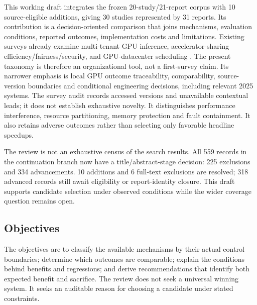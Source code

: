 This working draft integrates the frozen 20-study/21-report corpus with 10 source-eligible additions, giving 30 studies represented by 31 reports. Its contribution is a decision-oriented comparison that joins mechanisms, evaluation conditions, reported outcomes, implementation costs and limitations. Existing surveys already examine multi-tenant GPU inference, accelerator-sharing efficiency/fairness/security, and GPU-datacenter scheduling \cite{surveyYu,surveyHuang,surveyYe}. The present taxonomy is therefore an organizational tool, not a first-survey claim. Its narrower emphasis is local GPU outcome traceability, comparability, source-version boundaries and conditional engineering decisions, including relevant 2025 systems. The survey audit records accessed versions and unavailable contextual leads; it does not establish exhaustive novelty. It distinguishes performance interference, resource partitioning, memory protection and fault containment. It also retains adverse outcomes rather than selecting only favorable headline speedups.

The review is not an exhaustive census of the search results. All 559 records in the continuation branch now have a title/abstract-stage decision: 225 exclusions and 334 advancements. 10 additions and 6 full-text exclusions are resolved; 318 advanced records still await eligibility or report-identity closure. This draft supports candidate selection under observed conditions while the wider coverage question remains open.

\subsection{Objectives}
The objectives are to classify the available mechanisms by their actual control boundaries; determine which outcomes are comparable; explain the conditions behind benefits and regressions; and derive recommendations that identify both expected benefit and sacrifice. The review does not seek a universal winning system. It seeks an auditable reason for choosing a candidate under stated constraints.

